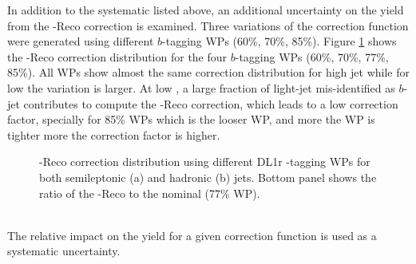 In addition to the systematic listed above, an additional uncertainty on the yield from the \pT-Reco correction is examined. Three variations of the correction function were generated using different $b$-tagging WPs (60\%, 70\%, 85\%). Figure \ref{fig:HHyybb:Sys:Exp:PtReco} shows the \pT-Reco correction distribution for the four $b$-tagging WPs (60\%, 70\%, 77\%, 85\%). All WPs show almost the same correction distribution for high \pT jet while for low \pT the variation is larger. At low \pT, a large fraction of light-jet mis-identified as $b$-jet contributes to compute the \pT-Reco correction, which leads to a low correction factor, specially for 85\% WPs which is the looser WP, and more the WP is tighter more the correction factor is higher.
\begin{figure}[htbp]
   \centering
   \quad
   \begin{tcolorbox}[colback=black!5!white,colframe=white!75!black]
   \caption{\pT-Reco correction distribution using different DL1r \bq-tagging WPs for both semileptonic (a) and hadronic (b) jets. Bottom panel shows the ratio of the \pT-Reco to the nominal (77\% WP). }
   \label{fig:HHyybb:Sys:Exp:PtReco}
   \end{tcolorbox}
   
\end{figure}
\\
The relative impact on the yield for a given correction function is used as a systematic uncertainty. \\
